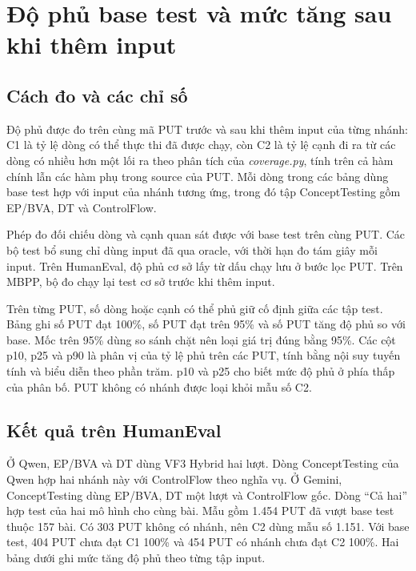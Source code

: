 \section{Độ phủ base test và mức tăng sau khi thêm input}
\label{sec:coverage-results}

\subsection{Cách đo và các chỉ số}

Độ phủ được đo trên cùng mã PUT trước và sau khi thêm input của từng nhánh: C1 là tỷ lệ dòng có thể thực thi đã được chạy, còn C2 là tỷ lệ cạnh đi ra từ các dòng có nhiều hơn một lối ra theo phân tích của \textit{coverage.py}, tính trên cả hàm chính lẫn các hàm phụ trong source của PUT. Mỗi dòng trong các bảng dùng base test hợp với input của nhánh tương ứng, trong đó tập ConceptTesting gồm EP/BVA, DT và ControlFlow.

Phép đo đối chiếu dòng và cạnh quan sát được với base test trên cùng PUT. Các bộ test bổ sung chỉ dùng input đã qua oracle, với thời hạn đo tám giây mỗi input. Trên HumanEval, độ phủ cơ sở lấy từ dấu chạy lưu ở bước lọc PUT. Trên MBPP, bộ đo chạy lại test cơ sở trước khi thêm input.

Trên từng PUT, số dòng hoặc cạnh có thể phủ giữ cố định giữa các tập test. Bảng ghi số PUT đạt 100\%, số PUT đạt trên 95\% và số PUT tăng độ phủ so với base. Mốc trên 95\% dùng so sánh chặt nên loại giá trị đúng bằng 95\%. Các cột p10, p25 và p90 là phân vị của tỷ lệ phủ trên các PUT, tính bằng nội suy tuyến tính và biểu diễn theo phần trăm. p10 và p25 cho biết mức độ phủ ở phía thấp của phân bố. PUT không có nhánh được loại khỏi mẫu số C2.

\subsection{Kết quả trên HumanEval}

Ở Qwen, EP/BVA và DT dùng VF3 Hybrid hai lượt. Dòng ConceptTesting của Qwen hợp hai nhánh này với ControlFlow theo nghĩa vụ. Ở Gemini, ConceptTesting dùng EP/BVA, DT một lượt và ControlFlow gốc. Dòng “Cả hai” hợp test của hai mô hình cho cùng bài. Mẫu gồm 1.454 PUT đã vượt base test thuộc 157 bài. Có 303 PUT không có nhánh, nên C2 dùng mẫu số 1.151. Với base test, 404 PUT chưa đạt C1 100\% và 454 PUT có nhánh chưa đạt C2 100\%. Hai bảng dưới ghi mức tăng độ phủ theo từng tập input.

